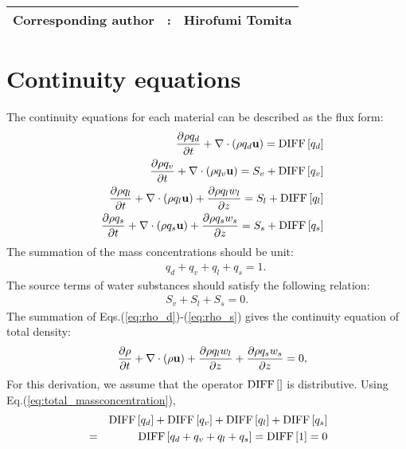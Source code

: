 {\bf \Large
\begin{tabular}{ccc}
\hline
  Corresponding author & : & Hirofumi Tomita\\
\hline
\end{tabular}
}

\section{Continuity equations}

The continuity equations for each material can be described as the flux form:
\begin{eqnarray}
&&  \frac{\partial \rho q_d}{\partial t}
+ \nabla \cdot\left(\rho q_d{\bf u}\right)  = {\rm DIFF}\left[q_d\right]
\label{eq:rho_d}\\
&&  \frac{\partial \rho q_v}{\partial t}
+ \nabla \cdot\left(\rho q_v {\bf u}\right)  = S_v + {\rm DIFF}\left[q_v\right]
\label{eq:rho_v}\\
&&  \frac{\partial \rho q_l}{\partial t}
+ \nabla \cdot\left(\rho q_l {\bf u}\right)
+ \frac{\partial \rho q_l w_l}{\partial z}=S_l + {\rm DIFF}\left[q_l\right]
\label{eq:rho_l}\\
&&  \frac{\partial \rho q_s}{\partial t}
+ \nabla \cdot\left(\rho q_s {\bf u}\right)
+ \frac{\partial \rho q_s w_s}{\partial z}=S_s + {\rm DIFF}\left[q_s\right]
\label{eq:rho_s}
\end{eqnarray}
The summation of the mass concentrations should be unit:
\begin{eqnarray}
&& q_d + q_v + q_l + q_s = 1. \label{eq:total_massconcentration}
\end{eqnarray}
The source terms of water substances should satisfy the following relation:
\begin{eqnarray}
  S_v + S_l + S_s = 0.
\end{eqnarray}
The summation of Eqs.(\ref{eq:rho_d})-(\ref{eq:rho_s}) gives the
continuity equation of total density:
\begin{eqnarray}
&&  \frac{\partial \rho}{\partial t}
+ \nabla\cdot\left(\rho{\bf u}\right)
+ \frac{\partial \rho q_l w_l}{\partial z}
+ \frac{\partial \rho q_s w_s}{\partial z}
=0, \label{eq:rhotot}
\end{eqnarray}
For this derivation,
we assume that
the operator ${ \rm DIFF}\left[\right]$ is distributive.
Using Eq.(\ref{eq:total_massconcentration}),
\begin{eqnarray}
&&  { \rm DIFF}\left[q_d\right]
+{ \rm DIFF}\left[q_v\right]
+{ \rm DIFF}\left[q_l\right]
+{ \rm DIFF}\left[q_s\right]\nonumber\\
&=&{ \rm DIFF}\left[q_d+q_v+q_l+q_s\right]
={ \rm DIFF}\left[1\right] = 0
\end{eqnarray}


